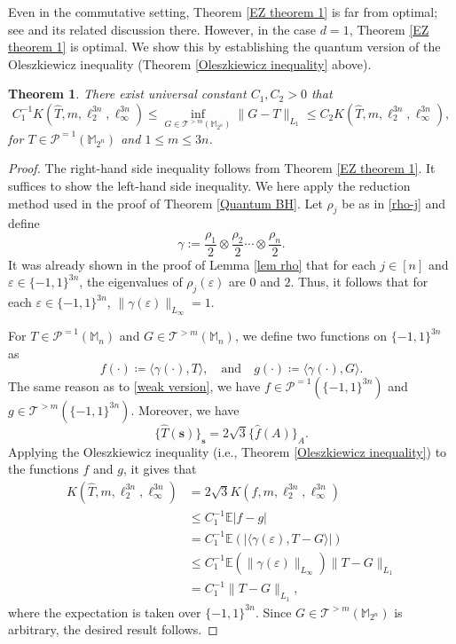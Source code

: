 \documentclass{amsbook}
\newtheorem{theorem}{Theorem}[chapter]
\theoremstyle{definition}
\theoremstyle{remark}
\numberwithin{section}{chapter}
\numberwithin{equation}{chapter}
\newcommand{\M}{\mathbb{M}}
\newcommand{\1}{\mathbf{1}}
\begin{document}
Even in the commutative setting, Theorem \ref{EZ theorem 1} is far from optimal; see \cite[Theorem 3]{EZ2024} and its related discussion there. 
However, in the case $d=1$, Theorem \ref{EZ theorem 1} is optimal. We show this by establishing 
 the quantum version of the Oleszkiewicz inequality (Theorem \ref{Oleszkiewicz inequality} above). 

\begin{theorem}\label{thm Ol}
There exist universal constant $C_1,C_2>0$ that 
\[
C_1^{-1} K\left(\widehat{T},m,\ell^{3n}_{2},\ell^{3n}_{\infty}\right)\leq \inf_{G\in \mathcal{T}^{>m}(\M_{2^n})}\|G-T\|_{L_{1}} \leq C_2 K\left(\widehat{T},m,\ell^{3n}_{2},\ell^{3n}_{\infty}\right),
\]
for $T\in \mathcal{P}^{=1}(\M_{2^n})$ and $1\leq m\leq 3n$.
\end{theorem}
\begin{proof}
The right-hand side inequality follows from Theorem \ref{EZ theorem 1}. It suffices to show the left-hand side inequality. 
We here apply the reduction method used in the proof of Theorem \ref{Quantum BH}. Let $\rho_j$ be as in \eqref{rho-j} and define
\[
\gamma:=\frac{\rho_1}{2}\otimes \frac{\rho_2}{2}\cdots \otimes \frac{\rho_n}{2}.
\]
It was already shown in the proof of Lemma \ref{lem rho} that for each $j\in [n]$ and $\varepsilon\in \{-1,1\}^{3n}$, the eigenvalues of $\rho_j(\varepsilon)$  are \(0\) and \(2\). Thus, it follows that for each  $\varepsilon\in \{-1,1\}^{3n}$, $\|\gamma(\varepsilon)\|_{L_{\infty}}=1$.


For $T\in \mathcal{P}^{=1}(\M_{n})$ and $G\in \mathcal{T}^{>m}(\M_{n})$, we define two functions on $\{-1,1\}^{3n}$ as
\[
f(\cdot)\coloneqq \langle \gamma(\cdot),T\rangle,\quad \mbox{and}\quad  g(\cdot)\coloneqq \langle \gamma(\cdot),G\rangle.
\]
The same reason as to \eqref{weak version}, we have $f\in \mathcal{P}^{=1}(\{-1,1\}^{3n})$ and $g\in \mathcal{T}^{>m}(\{-1,1\}^{3n})$. Moreover, we have 
$$\{\widehat{T}(\mathbf{s})\}_{\mathbf{s}}= 2\sqrt{3}\{\widehat{f}(A)\}_{A}.$$
 Applying the Oleszkiewicz inequality (i.e., Theorem \ref{Oleszkiewicz inequality}) to the functions $f$ and $g$, it gives that
\begin{align*}
K\left(\widehat{T},m,\ell^{3n}_{2},\ell^{3n}_{\infty}\right)&=2\sqrt{3} K\left(f,m,\ell^{3n}_{2},\ell^{3n}_{\infty}\right)\\
&\leq C_1^{-1}\mathbb{E}|f-g|\\
&= C_1^{-1}\mathbb{E}\left(\left|\langle\gamma(\varepsilon),T-G \rangle\right|\right)\\
&\leq C_1^{-1}\mathbb{E}\left(\|\gamma(\varepsilon)\|_{L_{\infty}}\right)\|T-G\|_{L_{1}}\\
&=C_1^{-1}\|T-G\|_{L_{1}},
\end{align*}
where the expectation is taken over $\{-1,1\}^{3n}$. Since $G\in \mathcal{T}^{>m}(\M_{2^n})$ is arbitrary, the desired result follows.
\end{proof}
\end{document}
